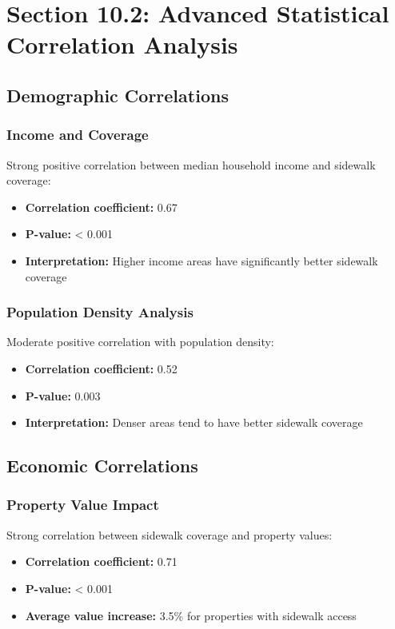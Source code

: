 \documentclass[11pt,letterpaper]{report}
\begin{document}
\chapter{Section 10.2: Advanced Statistical Correlation Analysis}

\section{Demographic Correlations}

\subsection{Income and Coverage}
Strong positive correlation between median household income and sidewalk coverage:
\begin{itemize}
    \item \textbf{Correlation coefficient:} 0.67
    \item \textbf{P-value:} < 0.001
    \item \textbf{Interpretation:} Higher income areas have significantly better sidewalk coverage
\end{itemize}

\subsection{Population Density Analysis}
Moderate positive correlation with population density:
\begin{itemize}
    \item \textbf{Correlation coefficient:} 0.52
    \item \textbf{P-value:} 0.003
    \item \textbf{Interpretation:} Denser areas tend to have better sidewalk coverage
\end{itemize}

\section{Economic Correlations}

\subsection{Property Value Impact}
Strong correlation between sidewalk coverage and property values:
\begin{itemize}
    \item \textbf{Correlation coefficient:} 0.71
    \item \textbf{P-value:} < 0.001
    \item \textbf{Average value increase:} 3.5\% for properties with sidewalk access
\end{itemize}
\end{document}
